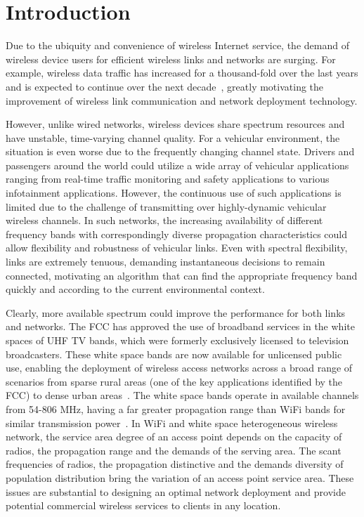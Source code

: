 \chapter{Introduction} \label{ch:introduction}



Due to the ubiquity and convenience of wireless Internet service, the demand of 
wireless device users for efficient wireless links and networks are surging.
For example, wireless data traffic has increased for a thousand-fold over the 
last years and is expected to continue over the next decade~\cite{metis}, 
greatly motivating the improvement of wireless link communication and network 
deployment technology.

However, unlike wired networks, wireless devices share spectrum resources 
and have unstable, time-varying channel quality. For a vehicular environment, 
the situation is even worse due to the frequently changing channel state. 
Drivers and passengers around the world could utilize a wide array of 
vehicular applications ranging from real-time traffic monitoring and safety 
applications to various infotainment applications. However, the continuous 
use of such applications is limited due to the challenge of transmitting over 
highly-dynamic vehicular wireless channels. In such networks, the increasing 
availability of different frequency bands with correspondingly diverse 
propagation characteristics could allow flexibility and robustness of vehicular 
links. Even with spectral flexibility, links are extremely tenuous, demanding 
instantaneous decisions to remain connected, motivating an algorithm that can 
find the appropriate frequency band quickly and according to the current 
environmental context.

Clearly, more available spectrum could improve the performance for both links and 
networks. The FCC has approved the use of broadband services in the white spaces of 
UHF TV bands, which were formerly exclusively licensed to television broadcasters. 
These white space bands are now available for unlicensed public use, enabling the 
deployment of wireless access networks across a broad range of scenarios from sparse 
rural areas (one of the key applications identified by the FCC) to dense urban 
areas~\cite{carlson}. The white space bands operate in available channels from 
54-806 MHz, having a far greater propagation range than WiFi bands for similar 
transmission power~\cite{balanis2012antenna}. In WiFi and white space heterogeneous 
wireless network, the service area degree of an access point depends on the capacity 
of radios, the propagation range and the demands of the serving area. The scant 
frequencies of radios, the propagation distinctive and the demands diversity of 
population distribution bring the variation of an access point service area. These 
issues are substantial to designing an optimal network deployment and provide potential 
commercial wireless services to clients in any location.

